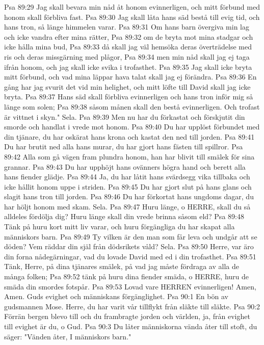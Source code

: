 Psa 89:29  Jag skall bevara min nåd åt honom evinnerligen, och mitt förbund med honom skall förbliva fast.
Psa 89:30  Jag skall låta hans säd bestå till evig tid, och hans tron, så länge himmelen varar.
Psa 89:31  Om hans barn övergiva min lag och icke vandra efter mina rätter,
Psa 89:32  om de bryta mot mina stadgar och icke hålla mina bud,
Psa 89:33  då skall jag väl hemsöka deras överträdelse med ris och deras missgärning med plågor,
Psa 89:34  men min nåd skall jag ej taga ifrån honom, och jag skall icke svika i trofasthet.
Psa 89:35  Jag skall icke bryta mitt förbund, och vad mina läppar hava talat skall jag ej förändra.
Psa 89:36  En gång har jag svurit det vid min helighet, och mitt löfte till David skall jag icke bryta.
Psa 89:37  Hans säd skall förbliva evinnerligen och hans tron inför mig så länge som solen;
Psa 89:38  såsom månen skall den bestå evinnerligen. Och trofast är vittnet i skyn." Sela.
Psa 89:39  Men nu har du förkastat och förskjutit din smorde och handlat i vrede mot honom.
Psa 89:40  Du har upplöst förbundet med din tjänare, du har oskärat hans krona och kastat den ned till jorden.
Psa 89:41  Du har brutit ned alla hans murar, du har gjort hans fästen till spillror.
Psa 89:42  Alla som gå vägen fram plundra honom, han har blivit till smälek för sina grannar.
Psa 89:43  Du har upphöjt hans ovänners högra hand och berett alla hans fiender glädje.
Psa 89:44  Ja, du har låtit hans svärdsegg vika tillbaka och icke hållit honom uppe i striden.
Psa 89:45  Du har gjort slut på hans glans och slagit hans tron till jorden.
Psa 89:46  Du har förkortat hans ungdoms dagar, du har höljt honom med skam. Sela.
Psa 89:47  Huru länge, o HERRE, skall du så alldeles fördölja dig? Huru länge skall din vrede brinna såsom eld?
Psa 89:48  Tänk på huru kort mitt liv varar, och huru förgängliga du har skapat alla människors barn.
Psa 89:49  Ty vilken är den man som får leva och undgår att se döden? Vem räddar din själ från dödsrikets våld? Sela.
Psa 89:50  Herre, var äro din forna nådegärningar, vad du lovade David med ed i din trofasthet.
Psa 89:51  Tänk, Herre, på dina tjänares smälek, på vad jag måste fördraga av alla de många folken;
Psa 89:52  tänk på huru dina fiender smäda, o HERRE, huru de smäda din smordes fotspår.
Psa 89:53  Lovad vare HERREN evinnerligen! Amen, Amen. Guds evighet och människans förgänglighet.
Psa 90:1  En bön av gudsmannen Mose. Herre, du har varit vår tillflykt från släkte till släkte.
Psa 90:2  Förrän bergen blevo till och du frambragte jorden och världen, ja, från evighet till evighet är du, o Gud.
Psa 90:3  Du låter människorna vända åter till stoft, du säger: "Vänden åter, I människors barn."
